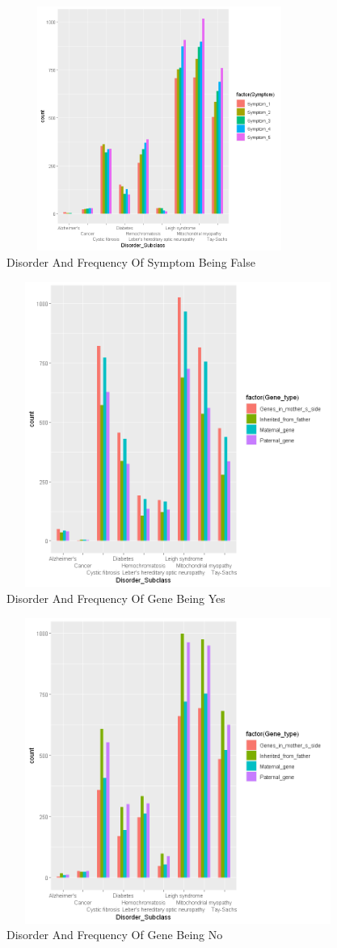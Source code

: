 \begin{figure}[htpb]
	\centering
	\includegraphics[height=8cm, width=10cm]{figures/s0.png}
	\caption{Disorder And Frequency Of Symptom Being False}
	\label{fig 25}
\end{figure}
\begin{figure}[htpb]
	\centering
	\includegraphics[height=10cm, width=12cm]{figures/gy.png}
	\caption{Disorder And Frequency Of Gene Being Yes}
	\label{fig 26}
\end{figure}
\begin{figure}[htpb]
	\centering
	\includegraphics[height=10cm, width=12cm]{figures/gn.png}
	\caption{Disorder And Frequency Of Gene Being No}
	\label{fig 27}
\end{figure}
\newpage
